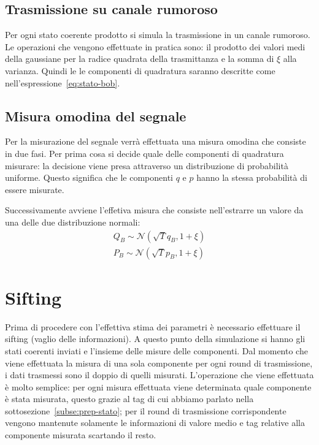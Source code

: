 \subsection{Trasmissione su canale rumoroso}
Per ogni stato coerente prodotto si simula la trasmissione in un canale rumoroso. Le operazioni che vengono effettuate in pratica sono: il prodotto dei valori medi della gaussiane per la radice quadrata della trasmittanza e la somma di $\xi$ alla varianza. Quindi le le componenti di quadratura saranno descritte come nell'espressione~\ref{eq:stato-bob}.

\subsection{Misura omodina del segnale}
Per la misurazione del segnale verr\`a effettuata una misura omodina che consiste in due fasi. Per prima cosa si decide quale delle componenti di quadratura misurare: la decisione viene presa attraverso un distribuzione di probabilit\`a uniforme. Questo significa che le componenti $q$ e $p$ hanno la stessa probabilit\`a di essere misurate.

Successivamente avviene l'effetiva misura che consiste nell'estrarre un valore da una delle due distribuzione normali:
\begin{equation}\label{eq:normal_dist_bob}
\begin{split}
Q_B \sim \mathcal N(\sqrt{T} q_B, 1 + \xi) \\
P_B \sim \mathcal N(\sqrt{T} p_B, 1 + \xi)
\end{split}
\end{equation}

\section{Sifting}\label{se:sifting}
Prima di procedere con l'effettiva stima dei parametri \`e necessario effettuare il sifting (vaglio delle informazioni). A questo punto della simulazione si hanno gli stati coerenti inviati e l'insieme delle misure delle componenti. Dal momento che viene effettuata la misura di una sola componente per ogni round di trasmissione, i dati trasmessi sono il doppio di quelli misurati. L'operazione che viene effettuata \`e molto semplice: per ogni misura effettuata viene determinata quale componente \`e stata misurata, questo grazie al tag di cui abbiamo parlato nella sottosezione~\ref{subse:prep-stato}; per il round di trasmissione corrispondente vengono mantenute solamente le informazioni di valore medio e tag relative alla componente misurata scartando il resto.

